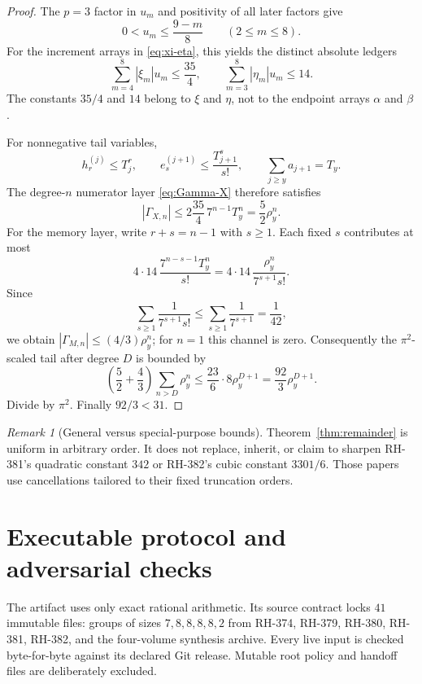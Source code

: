 \documentclass[11pt]{article}
\theoremstyle{definition}
\theoremstyle{remark}
\newtheorem{remark}[theorem]{Remark}
\begin{document}
\begin{proof}
The $p=3$ factor in $u_m$ and positivity of all later factors give
\[
 0<u_m\le\frac{9-m}{8}\qquad(2\le m\le8).
\]
For the increment arrays in \eqref{eq:xi-eta}, this yields the distinct
absolute ledgers
\begin{equation}
 \sum_{m=4}^8|\xi_m|u_m\le\frac{35}{4},
 \qquad
 \sum_{m=3}^8|\eta_m|u_m\le14.
 \label{eq:increment-ledgers}
\end{equation}
The constants $35/4$ and $14$ belong to $\xi$ and $\eta$, not to the
endpoint arrays $\alpha$ and $\beta$.

For nonnegative tail variables,
\[
 h_r^{(j)}\le T_j^r,\qquad
 e_s^{(j+1)}\le\frac{T_{j+1}^s}{s!},
 \qquad \sum_{j\ge y}a_{j+1}=T_y.
\]
The degree-$n$ numerator layer \eqref{eq:Gamma-X} therefore satisfies
\[
 |\Gamma_{X,n}|
 \le2\frac{35}{4}\,7^{n-1}T_y^n
 =\frac52\rho_y^n.
\]
For the memory layer, write $r+s=n-1$ with $s\ge1$.  Each fixed $s$
contributes at most
\[
 4\cdot14\,\frac{7^{n-s-1}T_y^n}{s!}
 =4\cdot14\,\frac{\rho_y^n}{7^{s+1}s!}.
\]
Since
\[
 \sum_{s\ge1}\frac1{7^{s+1}s!}
 \le\sum_{s\ge1}\frac1{7^{s+1}}=\frac1{42},
\]
we obtain $|\Gamma_{M,n}|\le(4/3)\rho_y^n$; for $n=1$ this channel is
zero.  Consequently the $\pi^2$-scaled tail after degree $D$ is bounded by
\[
 \left(\frac52+\frac43\right)
 \sum_{n>D}\rho_y^n
 \le\frac{23}{6}\cdot8\rho_y^{D+1}
 =\frac{92}{3}\rho_y^{D+1}.
\]
Divide by $\pi^2$.  Finally $92/3<31$.
\end{proof}

\begin{remark}[General versus special-purpose bounds]
Theorem~\ref{thm:remainder} is uniform in arbitrary order.  It does not
replace, inherit, or claim to sharpen RH-381's quadratic constant $342$ or
RH-382's cubic constant $3301/6$.  Those papers use cancellations tailored
to their fixed truncation orders.
\end{remark}

\section{Executable protocol and adversarial checks}
\label{sec:artifact}

The artifact uses only exact rational arithmetic.  Its source contract locks
$41$ immutable files: groups of sizes $7,8,8,8,8,2$ from RH-374,
RH-379, RH-380, RH-381, RH-382, and the four-volume synthesis archive.
Every live input is checked byte-for-byte against its declared Git release.
Mutable root policy and handoff files are deliberately excluded.
\end{document}
